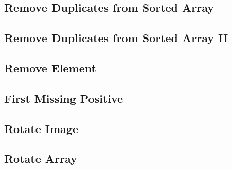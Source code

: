     
\subsection{Remove Duplicates from Sorted Array}

\subsection{Remove Duplicates from Sorted Array II}

\subsection{Remove Element}

\subsection{First Missing Positive}

\subsection{Rotate Image}

\subsection{Rotate Array}

